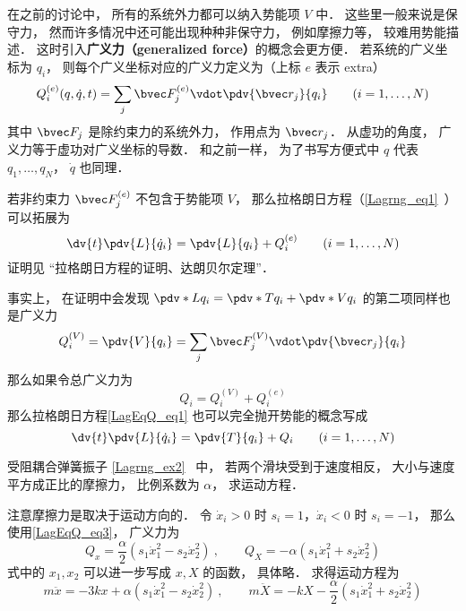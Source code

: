 

在之前的讨论中， 所有的系统外力都可以纳入势能项 $V$ 中． 这些里一般来说是保守力， 然而许多情况中还可能出现种种非保守力， 例如摩擦力等， 较难用势能描述． 这时引入\textbf{广义力（generalized force）}的概念会更方便． 若系统的广义坐标为 $q_i$， 则每个广义坐标对应的广义力定义为（上标 $e$ 表示 extra）
\begin{equation}\label{LagEqQ_eq3}
Q_i^{(e)}(q, \dot q, t) = \sum_j \bvec F_j^{(e)} \vdot \pdv{\bvec r_j}{q_i} \qquad (i=1,\dots,N)
\end{equation}
其中 $\bvec F_j$ 是除约束力的系统外力， 作用点为 $\bvec r_j$． 从虚功的角度， 广义力等于虚功对广义坐标的导数． 和之前一样， 为了书写方便式中 $q$ 代表 $q_1, \dots, q_N$， $\dot q$ 也同理．

若非约束力 $\bvec F_j^{(e)}$ 不包含于势能项 $V$， 那么拉格朗日方程（\autoref{Lagrng_eq1}~）可以拓展为
\begin{equation}\label{LagEqQ_eq1}
\dv{t} \pdv{L}{\dot q_i} = \pdv{L}{q_i} + Q_i^{(e)}
\qquad (i=1,\dots,N)
\end{equation}
证明见 “拉格朗日方程的证明、达朗贝尔定理”．

事实上， 在证明中会发现 $\pdv*{L}{q_i} = \pdv*{T}{q_i} + \pdv*{V}{q_i}$ 的第二项同样也是广义力
\begin{equation}
Q_i^{(V)} = \pdv{V}{q_i} = \sum_j \bvec F_j^{(V)} \vdot \pdv{\bvec r_j}{q_i}
\end{equation}
那么如果令总广义力为
\begin{equation}
Q_i = Q_i^{(V)} + Q_i^{(e)}
\end{equation}
那么拉格朗日方程\autoref{LagEqQ_eq1} 也可以完全抛开势能的概念写成
\begin{equation}\label{LagEqQ_eq2}
\dv{t} \pdv{L}{\dot q_i} = \pdv{T}{q_i} + Q_i
\qquad (i=1,\dots,N)
\end{equation}


\begin{example}{受阻耦合弹簧振子}
\autoref{Lagrng_ex2}~ 中， 若两个滑块受到于速度相反， 大小与速度平方成正比的摩擦力， 比例系数为 $\alpha$， 求运动方程．

注意摩擦力是取决于运动方向的． 令 $\dot x_i > 0$ 时 $s_i = 1$，$\dot x_i < 0$ 时 $s_i = -1$， 那么使用\autoref{LagEqQ_eq3}， 广义力为
\begin{equation}
Q_x = \frac{\alpha}{2}(s_1\dot x_1^2 - s_2 \dot x_2^2)~, \qquad
Q_X = -\alpha(s_1 \dot x_1^2 + s_2\dot x_2^2)
\end{equation}
式中的 $x_1,x_2$ 可以进一步写成 $x, X$ 的函数， 具体略． 求得运动方程为
\begin{equation}
m\ddot x =  - 3kx + \alpha(s_1\dot x_1^2 - s_2 \dot x_2^2)~, \qquad
m\ddot X =  - kX -\frac{\alpha}{2}(s_1 \dot x_1^2 + s_2\dot x_2^2)
\end{equation}
\end{example}
